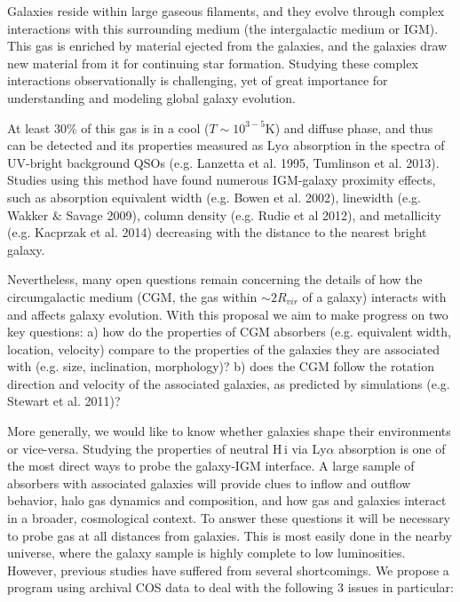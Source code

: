 \documentclass[12pt]{article}
\begin{document}
\indent \indent Galaxies reside within large gaseous filaments, and they evolve through complex interactions with this surrounding medium (the intergalactic medium or IGM). This gas is enriched by material ejected from the galaxies, and the galaxies draw new material from it for continuing star formation. Studying these complex interactions observationally is challenging, yet of great importance for understanding and modeling global galaxy evolution.


At least $30\%$ of this gas is in a cool ($T \sim 10^{3-5}$K) and diffuse phase, and thus can be detected and its properties measured as Ly$\alpha$ absorption in the spectra of UV-bright background QSOs (e.g. Lanzetta et al. 1995, Tumlinson et al. 2013). Studies using this method have found numerous IGM-galaxy proximity effects, such as absorption equivalent width (e.g. Bowen et al. 2002), linewidth (e.g. Wakker $\&$ Savage 2009), column density (e.g. Rudie et al 2012), and metallicity (e.g. Kacprzak et al. 2014) decreasing with the distance to the nearest bright galaxy. 


Nevertheless, many open questions remain concerning the details of how the circumgalactic medium (CGM, the gas within $\sim 2R_{vir}$ of a galaxy) interacts with and affects galaxy evolution. With this proposal we aim to make progress on two key questions:
a) how do the properties of CGM absorbers (e.g. equivalent width, location, velocity) compare to the properties of the galaxies they are associated with (e.g. size, inclination, morphology)?
b) does the CGM follow the rotation direction and velocity of the associated galaxies, as predicted by simulations (e.g. Stewart et al. 2011)?

More generally, we would like to know whether galaxies shape their environments or vice-versa. Studying the properties of neutral H\,{\sc i} via Ly$\alpha$ absorption is one of the most direct ways to probe the galaxy-IGM interface. A large sample of absorbers with associated galaxies will provide clues to inflow and outflow behavior, halo gas dynamics and composition, and how gas and galaxies interact in a broader, cosmological context. To answer these questions it will be necessary to probe gas at all distances from galaxies. This is most easily done in the nearby universe, where the galaxy sample is highly complete to low luminosities. However, previous studies have suffered from several shortcomings. We propose a program using archival COS data to deal with the following 3 issues in particular:\\
\end{document}
